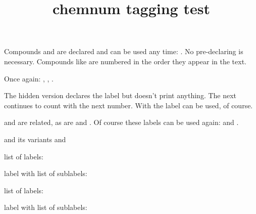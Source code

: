 \documentclass{article}
\title{chemnum tagging test}
\begin{document}
Compounds  and  are declared and can be used any time:
. No pre-declaring is necessary. Compounds like  are
numbered in the order they appear in the text.\par
Once again: , , .

The hidden version declares the label but doesn't print anything.
The next  continues to count with the next number. With 
the label can be used, of course.

 and  are related, as are  and
. Of course these labels can be used again:  and
.

 and its variants  and 

list of labels: \par
label with list of sublabels: 

%
list of labels: \par
label with list of sublabels: 
\end{document}

